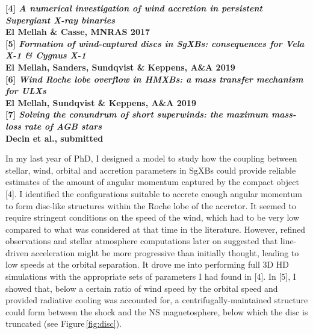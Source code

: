 \documentclass[letterpaper,12pt,onecolumn]{article}
\makeatletter
\newcommand{\sgxs}{SgXBs\xspace}
\newcommand*{\hmxb}{HMXB\@\xspace}
\newcommand*{\ns}{NS\@\xspace}
\makeatother
\begin{document}
\footnotesize
\textbf{[4] \textit{A numerical investigation of wind accretion in persistent Supergiant X-ray binaries}}\\
\hspace*{16pt}\textbf{El Mellah \& Casse, MNRAS 2017}\\
\textbf{[5] \textit{Formation of wind-captured discs in SgXBs: consequences for Vela X-1 \& Cygnus X-1}}\\
\hspace*{16pt}\textbf{El Mellah, Sanders, Sundqvist \& Keppens, A\&A 2019}\\
\textbf{[6] \textit{Wind Roche lobe overflow in HMXBs: a mass transfer mechanism for ULXs}}\\
\hspace*{16pt}\textbf{El Mellah, Sundqvist \& Keppens, A\&A 2019}\\
\textbf{[7] \textit{Solving the conundrum of short superwinds: the maximum mass-loss rate of AGB stars}}\\
\hspace*{16pt}\textbf{Decin et al., submitted}\\

\normalsize


In my last year of PhD, I designed a model to study how the coupling between stellar, wind, orbital and accretion parameters in \sgxs could provide reliable estimates of the amount of angular momentum captured by the compact object [4]. I identified the configurations suitable to accrete enough angular momentum to form disc-like structures within the Roche lobe of the accretor. It seemed to require stringent conditions on the speed of the wind, which had to be very low compared to what was considered at that time in the literature. However, refined observations and stellar atmosphere computations later on suggested that line-driven acceleration might be more progressive than initially thought, leading to low speeds at the orbital separation. It drove me into performing full 3D HD simulations with the appropriate sets of parameters I had found in [4]. In [5], I showed that, below a certain ratio of wind speed by the orbital speed and provided radiative cooling was accounted for, a centrifugally-maintained structure could form between the shock and the \ns magnetosphere, below which the disc is truncated (see Figure\,\ref{fig:disc}). 
\end{document}
